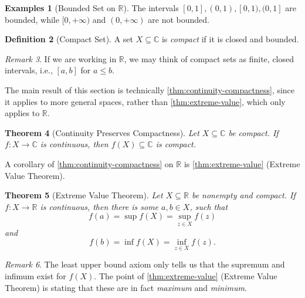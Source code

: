\documentclass[11pt]{article}
\numberwithin{equation}{section}
\newtheorem{theorem}{Theorem}[section]
\theoremstyle{definition}
\newtheorem{definition}[theorem]{Definition}
\newtheorem{examples}[theorem]{Examples}
\theoremstyle{remark}
\newtheorem{remark}[theorem]{Remark}
\newcommand{\pqty}[1]{\left(#1\right)}
\newcommand{\ccintv}[2]{[#1,#2]}
\newcommand{\oointv}[2]{(#1,#2)}
\newcommand{\cointv}[2]{[#1,#2)}
\newcommand{\ocintv}[2]{(#1,#2]}
\newcommand{\functiondomain}[3]{#1:#2\to #3}
\newcommand{\RR}{\mathbb R}
\newcommand{\CC}{\mathbb C}
\newcommand{\plusinfty}{+\infty}
\begin{document}
\begin{examples}[Bounded Set on \(\RR\)]\label{analysis-unit-0089}
    \label{ex:bounded-set-r}%
    The intervals \(\ccintv{0}{1}, \oointv{0}{1}, \cointv{0}{1}, \ocintv{0}{1}\) are bounded, while \(\cointv{0}{\plusinfty}\) and \(\oointv{0}{\plusinfty}\) are not bounded.
\end{examples}

\begin{definition}[Compact Set]\label{analysis-unit-0090}
    \label{def:compact-set}%
    A set \(X \subseteq \CC\) is \emph{compact} if it is closed and bounded.
\end{definition}

\begin{remark}\label{analysis-unit-0091}
    If we are working in \(\RR\), we may think of compact sets as finite, closed intervals, i.e., \(\ccintv{a}{b}\) for \(a \leq b\).
\end{remark}

The main result of this section is technically \autoref{thm:continuity-compactness}, since it applies to more general spaces, rather than \autoref{thm:extreme-value}, which only applies to \(\RR\).

\begin{theorem}[Continuity Preserves Compactness]\label{analysis-unit-0092}
    \label{thm:continuity-compactness}%
    Let \(X \subseteq \CC\) be compact. If \(\functiondomain{f}{X}{\CC}\) is continuous, then \(f\pqty{X} \subseteq \CC\) is compact.
\end{theorem}

A corollary of \autoref{thm:continuity-compactness} on \(\RR\) is \autoref{thm:extreme-value} (Extreme Value Theorem).

\begin{theorem}[Extreme Value Theorem]\label{analysis-unit-0093}
    \label{thm:extreme-value}%
    Let \(X \subseteq \RR\) be nonempty and compact. If \(\functiondomain{f}{X}{\RR}\) is continuous, then there is some \(a, b \in X\), such that
    \[
        f\pqty{a} = \sup f\pqty{X} = \sup_{z \in X} f\pqty{z}
    \]
    and
    \[
        f\pqty{b} = \inf f\pqty{X} = \inf_{z \in X} f\pqty{z}.
    \]
\end{theorem}

\begin{remark}\label{analysis-unit-0094}
    The least upper bound axiom only tells us that the supremum and infimum exist for \(f\pqty{X}\). The point of \autoref{thm:extreme-value} (Extreme Value Theorem) is stating that these are in fact \emph{maximum} and \emph{minimum}.
\end{remark}
\end{document}
